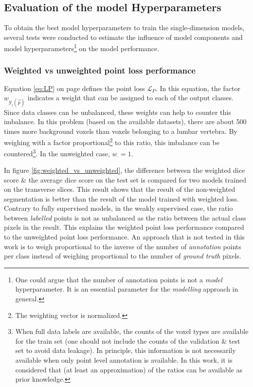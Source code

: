 \subsection{Evaluation of the model Hyperparameters}

\par{
    To obtain the best model hyperparameters to train the single-dimension models, several tests were conducted to estimate the influence of model components and model hyperparameters\footnote{
        One could argue that the number of annotation points is not a \textit{model} hyperparameter. It is an essential parameter for the \textit{modelling} approach in general.
    } on the model performance.
}

\subsubsection{Weighted vs unweighted point loss performance}

\par{
    Equation \ref{eq:LP} on page \pageref{eq:LP} defines the point loss $\mathcal{L}_P$. 
    In this equation, the factor $w_{\mathcal{Y}_i(\vec{p})}$ indicates a weight that can be assigned to each of the output classes.
    Since data classes can be unbalanced, these weights can help to counter this imbalance.
    In this problem (based on the available datasets), there are about 500 times more background voxels than voxels belonging to a lumbar vertebra.
    By weighing with a factor proportional\footnote{The weighting vector is normalized.} to this ratio, this imbalance can be countered\footnote{
        When full data labels are available, the counts of the voxel types are available for the train set (one should not include the counts of the validation \& test set to avoid data leakage).
        In principle, this information is not necessarily available when only point level annotation is available. In this work, it is considered that (at least an approximation) of the ratios can be available as prior knowledge.
    }. In the unweighted case, $w_{\cdot} = 1$.
}
\par{
    In figure \ref{fig:weighted_vs_unweighted}, the difference between the weighted dice score \& the average dice score on the test set is compared for two models trained on the transverse slices.
    This result shows that the result of the non-weighted segmentation is better than the result of the model trained with weighted loss.
    Contrary to fully supervised models, in the weakly supervised case, the ratio between \textit{labelled} points is not as unbalanced as the ratio between the actual class pixels in the result.
    This explains the weighted point loss performance compared to the unweighted point loss performance.
    An approach that is not tested in this work is to weigh proportional to the inverse of the number of \textit{annotation} points per class instead of weighing proportional to the number of \textit{ground truth} pixels.
}


